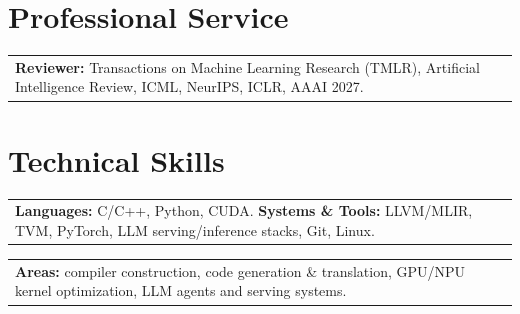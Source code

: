 \documentclass[11pt]{article}
\makeatletter
\newcommand{\datedline}[2]{%
  \noindent\begin{tabularx}{\textwidth}{@{}X@{}r@{}}
  #1 & {\small #2}
  \end{tabularx}\par}
\makeatother
\begin{document}
\section{Professional Service}
\datedline{\textbf{Reviewer:} Transactions on Machine Learning Research (TMLR), Artificial Intelligence Review, ICML, NeurIPS, ICLR, AAAI 2027.}{}

\section{Technical Skills}
\datedline{\textbf{Languages:} C/C++, Python, CUDA. \quad \textbf{Systems \& Tools:} LLVM/MLIR, TVM, PyTorch, LLM serving/inference stacks, Git, Linux.}{}
\datedline{\textbf{Areas:} compiler construction, code generation \& translation, GPU/NPU kernel optimization, LLM agents and serving systems.}{}
\end{document}
